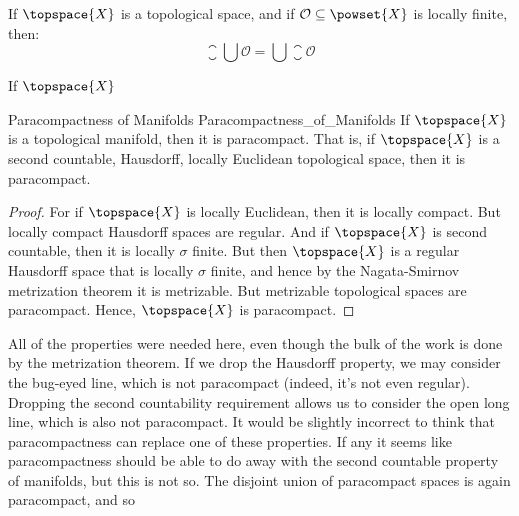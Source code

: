             \begin{theorem}
                If $\topspace{X}$ is a topological space, and if
                $\mathcal{O}\subseteq\powset{X}$ is locally finite, then:
                \begin{equation}
                    \closure{\bigcup\mathcal{O}}=
                    \bigcup\closure{\mathcal{O}}
                \end{equation}
            \end{theorem}
            \begin{theorem}
                If $\topspace{X}$
            \end{theorem}
            \begin{ftheorem}{Paracompactness of Manifolds}
                            {Paracompactness_of_Manifolds}
                If $\topspace{X}$ is a topological manifold, then it is
                paracompact. That is, if $\topspace{X}$ is a second countable,
                Hausdorff, locally Euclidean topological space, then it is
                paracompact.
            \end{ftheorem}
            \begin{proof}
                For if $\topspace{X}$ is locally Euclidean, then it is locally
                compact. But locally compact Hausdorff spaces are regular. And
                if $\topspace{X}$ is second countable, then it is locally
                $\sigma$ finite. But then $\topspace{X}$ is a regular Hausdorff
                space that is locally $\sigma$ finite, and hence by the
                Nagata-Smirnov metrization theorem it is metrizable. But
                metrizable topological spaces are paracompact. Hence,
                $\topspace{X}$ is paracompact.
            \end{proof}
            All of the properties were needed here, even though the bulk of the
            work is done by the metrization theorem. If we drop the Hausdorff
            property, we may consider the bug-eyed line, which is not
            paracompact (indeed, it's not even regular). Dropping the second
            countability requirement allows us to consider the open long line,
            which is also not paracompact. It would be slightly incorrect to
            think that paracompactness can replace one of these properties. If
            any it seems like paracompactness should be able to do away with
            the second countable property of manifolds, but this is not so. The
            disjoint union of paracompact spaces is again paracompact, and so
